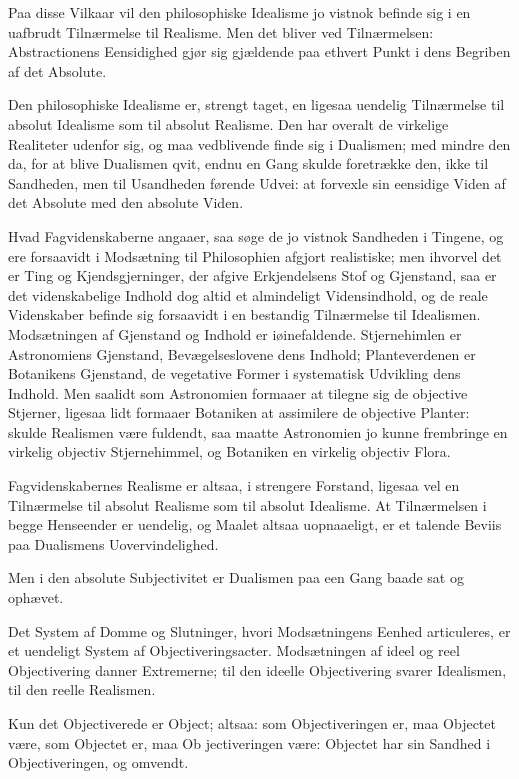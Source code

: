 \documentclass[12pt]{book}
\newcommand{\opage}[1]{\marginnote{\footnotesize\textit{[#1]}}}
\begin{document}
Paa disse Vilkaar vil den philosophiske Idealisme jo vistnok befinde
sig i en uafbrudt Tilnærmelse til Realisme. Men det bliver ved
Tilnærmelsen: Abstractionens Eensidighed gjør sig gjældende paa
ethvert Punkt i dens Begriben af det Absolute.

Den philosophiske Idealisme er, strengt taget, en ligesaa uendelig
Tilnærmelse til absolut Idealisme som til absolut Realisme. Den har
overalt de virkelige Realiteter udenfor sig, og maa vedblivende
finde sig i Dualismen; med mindre den da, for at blive Dualismen
qvit, endnu en Gang skulde
\opage{74} foretrække den, ikke til Sandheden, men til Usandheden førende
Udvei: at forvexle sin eensidige Viden af det Absolute med den
absolute Viden.

Hvad Fagvidenskaberne angaaer, saa søge de jo vistnok Sandheden i
Tingene, og ere forsaavidt i Modsætning til Philosophien afgjort
realistiske; men ihvorvel det er Ting og Kjendsgjerninger, der
afgive Erkjendelsens Stof og Gjenstand, saa er det videnskabelige
Indhold dog altid et almindeligt Vidensindhold, og de reale
Videnskaber befinde sig forsaavidt i en bestandig Tilnærmelse til
Idealismen. Modsætningen af Gjenstand og Indhold er iøinefaldende.
Stjernehimlen er Astronomiens Gjenstand, Bevægelseslovene dens
Indhold; Planteverdenen er Botanikens Gjenstand, de vegetative
Former i systematisk Udvikling dens Indhold. Men saalidt som
Astronomien formaaer at tilegne sig de objective Stjerner, ligesaa
lidt formaaer Botaniken at assimilere de objective Planter: skulde
Realismen være fuldendt, saa maatte Astronomien jo kunne frembringe
en virkelig objectiv Stjernehimmel, og Botaniken en virkelig
objectiv Flora.

Fagvidenskabernes Realisme er altsaa, i strengere Forstand, ligesaa
vel en Tilnærmelse til absolut Realisme som til absolut Idealisme.
At Tilnærmelsen i begge Henseender er uendelig, og Maalet altsaa
uopnaaeligt, er et talende Beviis paa Dualismens Uovervindelighed.

Men i den absolute Subjectivitet er Dualismen paa een Gang baade sat
og ophævet.

Det System af Domme og Slutninger, hvori Modsætningens Eenhed
articuleres, er et uendeligt System af Objectiveringsacter.
Modsætningen af ideel og reel Objectivering danner Extremerne; til
den ideelle Objectivering svarer Idealismen, til den reelle
Realismen.

Kun det Objectiverede er Object; altsaa: som Objectiveringen er, maa
Objectet være, som Objectet er, maa Ob\-%
\opage{75}jectiveringen være: Objectet har sin Sandhed i Objectiveringen, og
omvendt.
\end{document}
